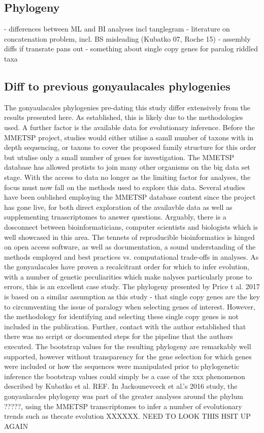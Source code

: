 \documentclass[12pt]{article}
\begin{document}
\subsection*{Phylogeny}
- differences between ML and BI analyses incl tanglegram
- literature on concatenation problem, incl. BS misleading (Kubatko 07, Roche 15)
- assembly diffs if transrate pans out
- something about single copy genes for paralog riddled taxa

\subsection*{Diff to previous gonyaulacales phylogenies}

The gonyaulacales phylogenies pre-dating this study differ extensively from the results presented here. As established, this is likely due to the methodologies used. A further factor is the available data for evolutionary inference. Before the MMETSP project, studies would either utilise a samll number of taxons with in depth sequencing, or taxons to cover the proposed family structure for this order but utulise only a small number of genes for investigation. The MMETSP database has allowed protists to join many other organisms on the big data set stage. With the access to data no longer as the limiting factor for analyses, the focus must now fall on the methods used to explore this data.
Several studies have been oublished employing the MMETSP database content since the project has gone live, for both direct exploration of the availavble data as well as supplementing trnascriptomes to answer questions. Arguably, there is a dosconnect between bioinformaticians, computer scientists and biologists which is well showcased in this area. The tennets of reproducible bioinformatics is hinged on open access software, as well as documentation, a sound understanding of the methods employed and best practices vs. computational trade-offs in analyses. As the gonyaulacales have proven a recalcitrant order for which to infer evolution, with a number of genetic peculiarities which make nalyses particularly prone to errors, this is an excellent case study.
The phylogeny presented by Price t al. 2017 is based on a similar assumption as this study - that single copy genes are the key to circumventing the issue of paralogy when selecting genes of interest. However, the methodology for identifying and selecting these single copy genes is not included in the publication. Further, contact with the author established that there was no script or documented steps for the pipeline that the authors executed. The bootstrap values for the resulting phylogeny are remarkably well supported, however without transparency for the gene selection for which genes were included or how the sequences were manipulated prior to phylogenetic inference the bootstrap values could simply be a case of the xxx phenomenon described by Kubatko et al. REF.
In Jackounevceck et al.'s 2016 study, the gonyaulacales phylogeny was part of the greater analyses around the phylum ?????, using the MMETSP transcriptomes to infer a number of evolutionary trends such as thecate evolution XXXXXX. NEED TO LOOK THIS HSIT UP AGAIN
\end{document}
